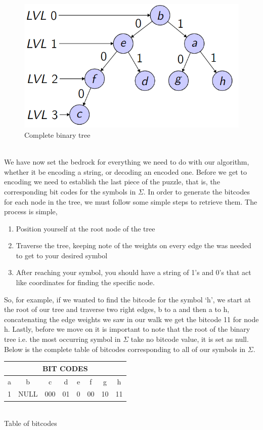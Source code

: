 \documentclass[12pt]{IEEEtran}
\begin{document}
\begin{figure}[h]
    \centering
    \includegraphics[scale=0.35]{../presentation/images/bintree.png}
    \captionsetup{justification=centering}
    \caption{Complete binary tree}
\end{figure}
\\
We have now set the bedrock for everything we need to do with our algorithm, whether it be encoding a string, or decoding 
an encoded one. Before we get to encoding we need to establish the last piece of the puzzle, that is, the corresponding 
bit codes for the symbols in $\Sigma$. In order to generate the bitcodes for each node in the tree, we must follow some simple steps
to retrieve them. The process is simple, 
\begin{enumerate}
	\item Position yourself at the root node of the tree
	\item Traverse the tree, keeping note of the weights on every edge the was needed to get to your desired symbol
	\item After reaching your symbol, you should have a string of 1's and 0's that act like coordinates for finding the specific node.
\end{enumerate}
So, for example, if we wanted to find the bitcode for the symbol `h', we start at the root of our tree and traverse
two right edges, b to a and then a to h, concatenating the edge weights we saw in our walk we get the bitcode 11 for node h. Lastly, before we move on
it is important to note that the root of the binary tree i.e. the most occurring symbol in $\Sigma$ take no bitcode value, it is set as null.
Below is the complete table of bitcodes corresponding to all of our symbols in $\Sigma$.\\
\begin{center}
	\begin{tabular}{|c|c|c|c|c|c|c|c|}
		\hline
		\multicolumn{8}{|c|}{BIT CODES} \\
		\hline
		a & b & c & d & e & f & g & h \\
		\hline
		1  & NULL  & 000  & 01  & 0  & 00  & 10  & 11\\
		\hline
	\end{tabular}\\
	\vspace{0.1in}
	Table of bitcodes
\end{center}
\end{document}
